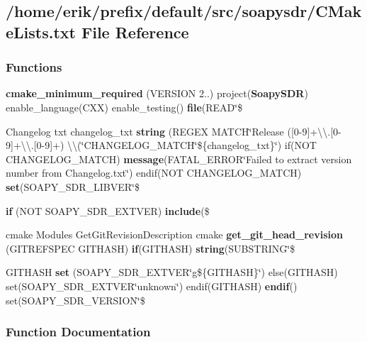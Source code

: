 \subsection{/home/erik/prefix/default/src/soapysdr/\+C\+Make\+Lists.txt File Reference}
\label{soapysdr_2CMakeLists_8txt}
\subsubsection*{Functions}
\begin{DoxyCompactItemize}
\item 
{\bf cmake\+\_\+minimum\+\_\+required} (V\+E\+R\+S\+I\+ON 2..) project({\bf Soapy\+S\+DR}) enable\+\_\+language(C\+XX) enable\+\_\+testing() {\bf file}(R\+E\+AD\char`\"{}\$
\item 
Changelog txt changelog\+\_\+txt {\bf string} (R\+E\+G\+EX M\+A\+T\+CH\char`\"{}Release ([0-\/9]+\textbackslash{}\textbackslash{}.[0-\/9]+\textbackslash{}\textbackslash{}.[0-\/9]+) \textbackslash{}\textbackslash{}(\char`\"{}C\+H\+A\+N\+G\+E\+L\+O\+G\+\_\+\+M\+A\+T\+CH\char`\"{}\$\{changelog\+\_\+txt\}\char`\"{}) if(N\+OT C\+H\+A\+N\+G\+E\+L\+O\+G\+\_\+\+M\+A\+T\+CH) {\bf message}(F\+A\+T\+A\+L\+\_\+\+E\+R\+R\+OR\char`\"{}Failed to extract version number from Changelog.\+txt\char`\"{}) endif(N\+OT C\+H\+A\+N\+G\+E\+L\+O\+G\+\_\+\+M\+A\+T\+CH) {\bf set}(S\+O\+A\+P\+Y\+\_\+\+S\+D\+R\+\_\+\+L\+I\+B\+V\+ER\char`\"{}\$
\item 
{\bf if} (N\+OT S\+O\+A\+P\+Y\+\_\+\+S\+D\+R\+\_\+\+E\+X\+T\+V\+ER) {\bf include}(\$
\item 
cmake Modules Get\+Git\+Revision\+Description cmake {\bf get\+\_\+git\+\_\+head\+\_\+revision} (G\+I\+T\+R\+E\+F\+S\+P\+EC G\+I\+T\+H\+A\+SH) {\bf if}(G\+I\+T\+H\+A\+SH) {\bf string}(S\+U\+B\+S\+T\+R\+I\+NG\char`\"{}\$
\item 
G\+I\+T\+H\+A\+SH {\bf set} (S\+O\+A\+P\+Y\+\_\+\+S\+D\+R\+\_\+\+E\+X\+T\+V\+ER\char`\"{}g\$\{G\+I\+T\+H\+A\+SH\}\char`\"{}) else(G\+I\+T\+H\+A\+SH) set(S\+O\+A\+P\+Y\+\_\+\+S\+D\+R\+\_\+\+E\+X\+T\+V\+ER\char`\"{}unknown\char`\"{}) endif(G\+I\+T\+H\+A\+SH) {\bf endif}() set(S\+O\+A\+P\+Y\+\_\+\+S\+D\+R\+\_\+\+V\+E\+R\+S\+I\+ON\char`\"{}\$
\end{DoxyCompactItemize}


\subsubsection{Function Documentation}
